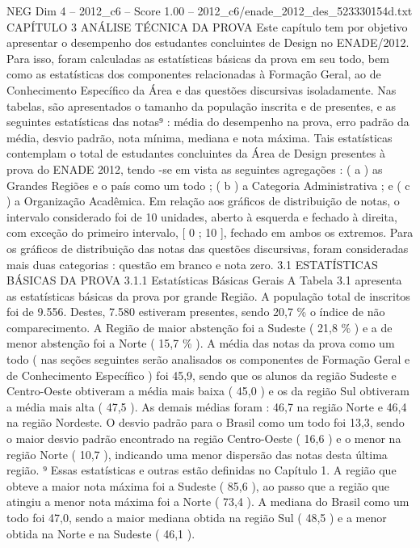 \begin{textsample}{NEG Dim 4 – 2012\_c6 – Score 1.00 – 2012\_c6/enade\_2012\_des\_523330154d.txt}  \label{ex:f4_neg_233}
CAPÍTULO 3 ANÁLISE TÉCNICA DA PROVA Este capítulo tem por objetivo apresentar o desempenho dos estudantes concluintes de Design no ENADE/2012.
Para isso, foram calculadas as estatísticas básicas da prova em seu todo, bem como as estatísticas dos componentes relacionadas à Formação Geral, ao de Conhecimento Específico da Área e das questões discursivas isoladamente.
Nas tabelas, são apresentados o tamanho da população inscrita e de presentes, e as seguintes estatísticas das notas⁹ : média do desempenho na prova, erro padrão da média, desvio padrão, nota mínima, mediana e nota máxima.
Tais estatísticas contemplam o total de estudantes concluintes da Área de Design presentes à prova do ENADE 2012, tendo -se em vista as seguintes agregações : ( a ) as Grandes Regiões e o país como um todo ; ( b ) a Categoria Administrativa ; e ( c ) a Organização Acadêmica.
Em relação aos gráficos de distribuição de notas, o intervalo considerado foi de 10 unidades, aberto à esquerda e fechado à direita, com exceção do primeiro intervalo, [ 0 ; 10 ], fechado em ambos os extremos.
Para os gráficos de distribuição das notas das questões discursivas, foram consideradas mais duas categorias : questão em branco e nota zero. 3.1 ESTATÍSTICAS BÁSICAS DA PROVA 3.1.1 Estatísticas Básicas Gerais A Tabela 3.1 apresenta as estatísticas básicas da prova por grande Região.
A população total de inscritos foi de 9.556.
Destes, 7.580 estiveram presentes, sendo 20,7 \% o índice de não comparecimento.
A Região de maior abstenção foi a Sudeste ( 21,8 \% ) e a de menor abstenção foi a Norte ( 15,7 \% ).
A média das notas da prova como um todo ( nas seções seguintes serão analisados os componentes de Formação Geral e de Conhecimento Específico ) foi 45,9, sendo que os alunos da região Sudeste e Centro-Oeste obtiveram a média mais baixa ( 45,0 ) e os da região Sul obtiveram a média mais alta ( 47,5 ).
As demais médias foram : 46,7 na região Norte e 46,4 na região Nordeste.
O desvio padrão para o Brasil como um todo foi 13,3, sendo o maior desvio padrão encontrado na região Centro-Oeste ( 16,6 ) e o menor na região Norte ( 10,7 ), indicando uma menor dispersão das notas desta última região. ⁹ Essas estatísticas e outras estão definidas no Capítulo 1.
A região que obteve a maior nota máxima foi a Sudeste ( 85,6 ), ao passo que a região que atingiu a menor nota máxima foi a Norte ( 73,4 ).
A mediana do Brasil como um todo foi 47,0, sendo a maior mediana obtida na região Sul ( 48,5 ) e a menor obtida na Norte e na Sudeste ( 46,1 ).

\end{textsample}
